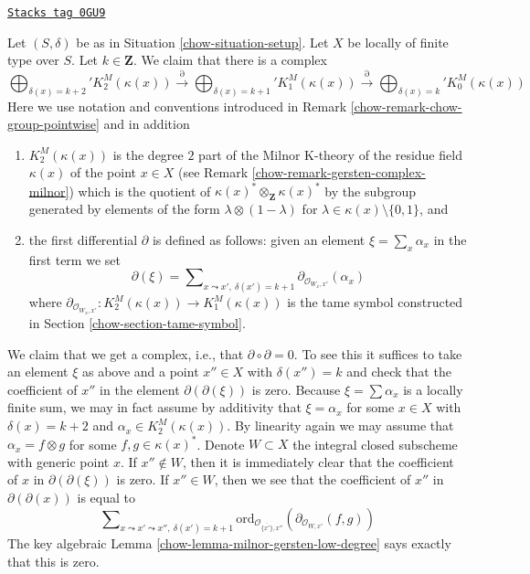\begin{remark}
\label{chow-remark-higher-chow-pointwise}
\href{https://stacks.math.columbia.edu/tag/0GU9}{\texttt{Stacks tag 0GU9}}

Let $(S, \delta)$ be as in Situation \ref{chow-situation-setup}.
Let $X$ be locally of finite type over $S$. Let $k \in \mathbf{Z}$.
We claim that there is a complex
$$
\bigoplus\nolimits_{\delta(x) = k + 2}' K_2^M(\kappa(x))
\xrightarrow{\partial}
\bigoplus\nolimits_{\delta(x) = k + 1}' K_1^M(\kappa(x))
\xrightarrow{\partial}
\bigoplus\nolimits_{\delta(x) = k}' K_0^M(\kappa(x))
$$
Here we use notation and conventions introduced in
Remark \ref{chow-remark-chow-group-pointwise} and in addition
\begin{enumerate}
\item $K_2^M(\kappa(x))$ is the degree $2$ part of
the Milnor K-theory of the residue field $\kappa(x)$ of the point
$x \in X$ (see Remark \ref{chow-remark-gersten-complex-milnor}) which
is the quotient of $\kappa(x)^* \otimes_\mathbf{Z} \kappa(x)^*$
by the subgroup generated by elements of the form
$\lambda \otimes (1 - \lambda)$ for
$\lambda \in \kappa(x) \setminus \{0, 1\}$, and
\item the first differential $\partial$ is defined as follows:
given an element $\xi = \sum_x \alpha_x$ in the first term
we set
$$
\partial(\xi) = \sum\nolimits_{x \leadsto x',\ \delta(x') = k + 1}
\partial_{\mathcal{O}_{W_x, x'}}(\alpha_x)
$$
where
$\partial_{\mathcal{O}_{W_x, x'}} : K_2^M(\kappa(x)) \to K_1^M(\kappa(x))$
is the tame symbol constructed in Section \ref{chow-section-tame-symbol}.
\end{enumerate}
We claim that we get a complex, i.e., that $\partial \circ \partial = 0$.
To see this it suffices to take an element $\xi$ as above and a point
$x'' \in X$ with $\delta(x'') = k$ and check that the coefficient of
$x''$ in the element $\partial(\partial(\xi))$ is zero.
Because $\xi = \sum \alpha_x$ is a locally finite sum, we
may in fact assume by additivity that $\xi = \alpha_x$ for
some $x \in X$ with $\delta(x) = k + 2$ and $\alpha_x \in K_2^M(\kappa(x))$.
By linearity again we may assume that $\alpha_x = f \otimes g$ for
some $f, g \in \kappa(x)^*$. Denote $W \subset X$ the integral closed
subscheme with generic point $x$. If $x'' \not \in W$, then it is
immediately clear that the coefficient of $x$ in $\partial(\partial(\xi))$
is zero. If $x'' \in W$, then we see that the coefficient of $x''$
in $\partial(\partial(x))$ is equal to
$$
\sum\nolimits_{x \leadsto x' \leadsto x'',\ \delta(x') = k + 1}
\text{ord}_{\mathcal{O}_{\overline{\{x'\}}, x''}}(
\partial_{\mathcal{O}_{W, x'}}(f, g))
$$
The key algebraic Lemma \ref{chow-lemma-milnor-gersten-low-degree}
says exactly that this is zero.
\end{remark}


